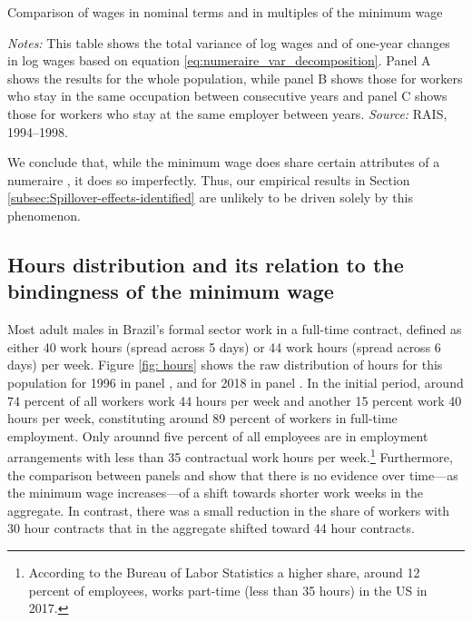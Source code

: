 \begin{table}[!htb]
  \centering
  \caption{Comparison of wages in nominal terms and in multiples of the minimum wage\label{tab:comparison_nominal_vs_multiples}}
  \pretabvspace
  
  \posttabvspace
  \begin{minipage}[t]{1\columnwidth}%
    \begin{spacing}{0.75}
      \emph{\scriptsize{}Notes: }{\scriptsize{}This table shows the total variance of log wages and of one-year changes in log wages based on equation \eqref{eq:numeraire_var_decomposition}. Panel A shows the results for the whole population, while panel B shows those for workers who stay in the same occupation between consecutive years and panel C shows those for workers who stay at the same employer between years. %
      \emph{\scriptsize{}Source:} RAIS, 1994--1998.}
    \end{spacing}
  \end{minipage}
\end{table}


We conclude that, while the minimum wage does share certain attributes of a numeraire , it does so imperfectly. Thus, our empirical results in Section \ref{subsec:Spillover-effects-identified} are unlikely to be driven solely by this phenomenon.




\clearpage
\subsection{Hours distribution and its relation to the bindingness of the minimum wage\label{sec:Hours}}

Most adult males in Brazil's formal sector work in a full-time contract,
defined as either 40 work hours (spread across 5 days) or 44 work
hours (spread across 6 days) per week. Figure \ref{fig: hours} shows
the raw distribution of hours for this population for 1996 in panel , and for 2018 in panel .
In the initial period, around 74 percent of all workers work 44 hours
per week and another 15 percent work 40 hours per week, constituting
around 89 percent of workers in full-time employment. Only arounnd
five percent of all employees are in employment arrangements with
less than 35 contractual work hours per week.\footnote{According to the Bureau of Labor Statistics a higher share, around
12 percent of employees, works part-time (less than 35 hours) in the
US in 2017.} Furthermore, the comparison between panels 
and  show that there is no evidence over
time---as the minimum wage increases---of a shift towards shorter
work weeks in the aggregate. In contrast, there was a small reduction
in the share of workers with 30 hour contracts that in the aggregate
shifted toward 44 hour contracts.


